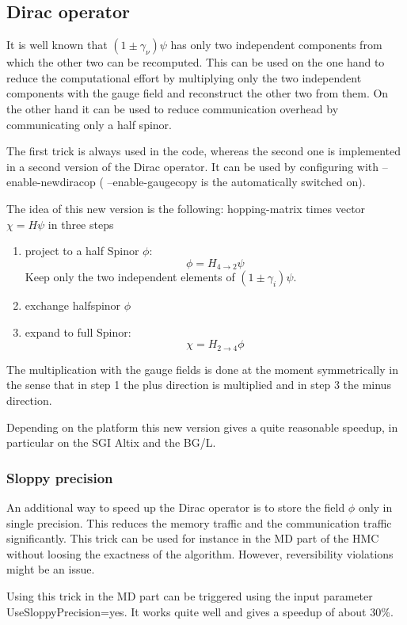 \subsection{Dirac operator}

It is well known that $(1 \pm \gamma_\nu)\psi$ has only two
independent components from which the other two can be
recomputed. This can be used on the one hand to reduce the
computational effort by multiplying only the two independent
components with the gauge field and reconstruct the other two from
them. On the other hand it can be used to reduce communication
overhead by communicating only a half spinor. 

The first trick is always used in the code, whereas the second one is
implemented in a second version of the Dirac operator. It can be used
by configuring with {\ttfamily --enable-newdiracop} ({\ttfamily
  --enable-gaugecopy} is the automatically switched on). 

The idea of this new version is the following:
hopping-matrix times vector $\chi=H\psi$ in three steps
\begin{enumerate}
\item<1-> project to a half Spinor $\phi$:
  \[
  \phi = H_{4\to 2}\psi
  \]
  Keep only the two independent elements of $(1\pm\gamma_i)\psi$.
\item<2-> exchange halfspinor $\phi$
\item<3-> expand to full Spinor:
  \[
  \chi = H_{2\to 4}\phi
  \]
\end{enumerate}
The multiplication with the gauge fields is done at the moment
symmetrically in the sense that in step 1 the plus direction is
multiplied and in step 3 the minus direction. 

Depending on the platform this new version gives a quite reasonable
speedup, in particular on the SGI Altix and the BG/L.

\subsubsection{Sloppy precision}

An additional way to speed up the Dirac operator is to store the field
$\phi$ only in single precision. This reduces the memory traffic and
the communication traffic significantly. This trick can be used for
instance in the MD part of the HMC without loosing the exactness of
the algorithm. However, reversibility violations might be an issue.

Using this trick in the MD part can be triggered using the input
parameter {\ttfamily UseSloppyPrecision=yes}. It works quite well and
gives a speedup of about 30\%.

